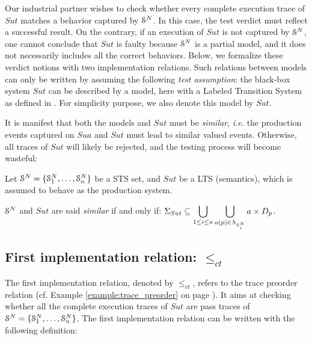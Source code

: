 Our industrial partner wishes to check whether every complete
execution trace of $\mathit{Sut}$ matches a behavior captured by
$\EuScript{S}^{N}$. In this case, the test verdict must reflect a
successful result. On the contrary, if an execution of
$\mathit{Sut}$ is not captured by $\EuScript{S}^{N}$, one cannot
conclude that $\mathit{Sut}$ is faulty because $\EuScript{S}^{N}$
is a partial model, and it does not necessarily includes all the
correct behaviors. Below, we formalize these verdict notions
with two implementation relations. Such relations between models
can only be written by assuming the following \emph{test
assumption}: the black-box system $\mathit{Sut}$ can be described
by a model, here with a Labeled Transition System as defined in
. For
simplicity purpose, we also denote this model by $\mathit{Sut}$.

It is manifest that both the models and $\mathit{Sut}$ must be
\emph{similar}, \emph{i.e.} the production events captured on
$\mathit{Sua}$ and $\mathit{Sut}$ must lead to similar valued
events. Otherwise, all traces of $\mathit{Sut}$ will likely be
rejected, and the testing process will become wasteful:

\begin{definition}
    Let $\EuScript{S}^N = \{ \EuScript{S}_1^N, \dots,
    \EuScript{S}_n^N \}$ be a STS set, and $\mathit{Sut}$ be a LTS
    (semantics), which is assumed to behave as the production
    system.

    $\EuScript{S}^N$ and $\mathit{Sut}$ are said \emph{similar}
    if and only if: $\displaystyle\Sigma_{Sut} \subseteq \bigcup_{1 \leq i \leq n}
    \bigcup_{a(p) \in \Lambda_{\EuScript{S}_i^N}} a \times D_p$.

    \label{def:similar-sut-sua}
\end{definition}

\subsection{First implementation relation: $\leq_{ct}$}

The first implementation relation, denoted by $\leq_{ct}$, refers
to the trace preorder relation
\cite{DNH84,vaandrager1991relationship} (cf. Example
\ref{example:trace_preorder} on page
\pageref{example:trace_preorder}).
It aims at checking whether all the complete execution traces of
$\mathit{Sut}$ are pass traces of
$\EuScript{S}^{N}=\{\EuScript{S}_1^{N},\dots,\EuScript{S}_n^{N}\}$.
The first implementation relation can be written with the
following definition:

